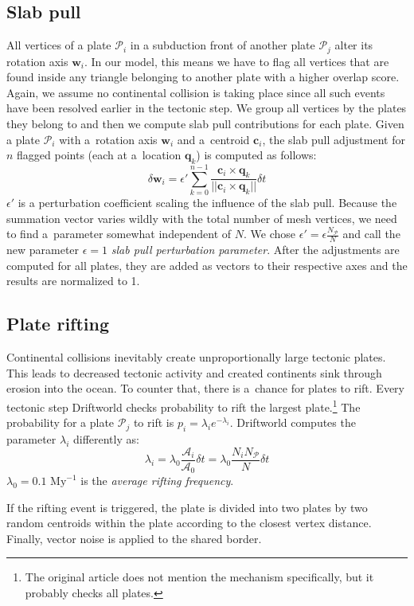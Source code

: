 \subsection{Slab pull}
All vertices of a plate $\mathcal{P}_i$ in a subduction front of another plate $\mathcal{P}_j$ alter its rotation axis $\mathbf{w}_i$. In our model, this means we have to flag all vertices that are found inside any triangle belonging to another plate with a higher overlap score. Again, we assume no continental collision is taking place since all such events have been resolved earlier in the tectonic step. We group all vertices by the plates they belong to and then we compute slab pull contributions for each plate. Given a plate $\mathcal{P}_i$ with a~rotation axis $\mathbf{w}_i$ and a~centroid $\mathbf{c}_i$, the slab pull adjustment for $n$ flagged points (each at a~location $\mathbf{q}_k$) is computed as follows:
$$\delta\mathbf{w}_i=\epsilon'\sum_{k=0}^{n-1}\frac{\mathbf{c}_i\times\mathbf{q}_k}{||\mathbf{c}_i\times\mathbf{q}_k||}\delta t$$
$\epsilon'$ is a perturbation coefficient scaling the influence of the slab pull. Because the summation vector varies wildly with the total number of mesh vertices, we need to find a~parameter somewhat independent of $N$. We chose $\epsilon'=\epsilon\frac{N_\mathcal{P}}{N}$ and call the new parameter $\epsilon=1$ \textit{slab pull perturbation parameter}. After the adjustments are computed for all plates, they are added as vectors to their respective axes and the results are normalized to 1.
\subsection{Plate rifting}
Continental collisions inevitably create unproportionally large tectonic plates. This leads to decreased tectonic activity and created continents sink through erosion into the ocean. To counter that, there is a~chance for plates to rift. Every tectonic step Driftworld checks probability to rift the largest plate.\footnote{The original article does not mention the mechanism specifically, but it probably checks all plates.} The probability for a plate $\mathcal{P}_j$ to rift is $p_i=\lambda_i e^{-\lambda_i}$. Driftworld computes the parameter $\lambda_i$ differently as:
$$\lambda_i=\lambda_0\frac{\mathcal{A}_i}{\mathcal{A}_0}\delta t=\lambda_0\frac{N_iN_\mathcal{P}}{N}\delta t$$
$\lambda_0=0.1\mbox{ My}^{-1}$ is the \textit{average rifting frequency}.

If the rifting event is triggered, the plate is divided into two plates by two random centroids within the plate according to the closest vertex distance. Finally, vector noise is applied to the shared border.
